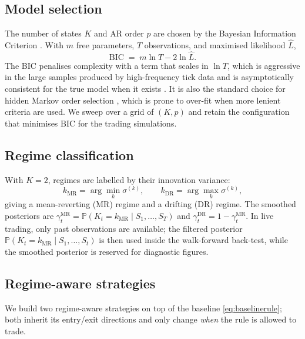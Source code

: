 \subsection{Model selection}\label{sec:modelselection}

The number of states $K$ and AR order $p$ are chosen by the Bayesian Information Criterion \parencite{schwarz1978bic}. With $m$ free parameters, $T$ observations, and maximised likelihood $\hat L$,
\begin{equation}\label{eq:bic}
    \mathrm{BIC} \;=\; m\ln T - 2\ln\hat L.
\end{equation}
The BIC penalises complexity with a term that scales in $\ln T$, which is aggressive in the large samples produced by high-frequency tick data and is asymptotically consistent for the true model when it exists \parencite{esl,tsay2010}. It is also the standard choice for hidden Markov order selection \parencite{cappe2005,krolzig1997msvar}, which is prone to over-fit when more lenient criteria are used. We sweep over a grid of $(K,p)$ and retain the configuration that minimises $\mathrm{BIC}$ for the trading simulations.

\subsection{Regime classification}\label{sec:regimes}

With $K=2$, regimes are labelled by their innovation variance:
\begin{equation}\label{eq:regimelabels}
    k_{\mathrm{MR}} = \arg\min_{k}\sigma^{(k)},
    \qquad
    k_{\mathrm{DR}} = \arg\max_{k}\sigma^{(k)},
\end{equation}
giving a mean-reverting (MR) regime and a drifting (DR) regime. The smoothed posteriors are $\gamma_t^{\mathrm{MR}} = \mathbb{P}(K_t = k_{\mathrm{MR}} \mid S_1,\ldots,S_T)$ and $\gamma_t^{\mathrm{DR}} = 1 - \gamma_t^{\mathrm{MR}}$. In live trading, only past observations are available; the filtered posterior $\mathbb{P}(K_t = k_{\mathrm{MR}} \mid S_1,\ldots,S_t)$ is then used inside the walk-forward back-test, while the smoothed posterior is reserved for diagnostic figures.

\subsection{Regime-aware strategies}\label{sec:regimestrategies}

We build two regime-aware strategies on top of the baseline \eqref{eq:baselinerule}; both inherit its entry/exit directions and only change \emph{when} the rule is allowed to trade.

